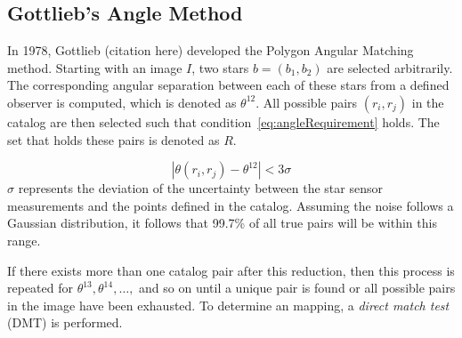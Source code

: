 
\subsection{Gottlieb's Angle Method}\label{subsec:gottlieb'sAngleMethod}
In 1978, Gottlieb (citation here) developed the Polygon Angular Matching method.
Starting with an image $I$, two stars $b = (b_1, b_2)$ are selected arbitrarily.
The corresponding angular separation between each of these stars from a defined observer is computed, which is
denoted as $\theta^{12}$.
All possible pairs $(r_i, r_j)$ in the catalog are then selected such that condition~\eqref{eq:angleRequirement} holds.
The set that holds these pairs is denoted as $R$.

\begin{equation}
    \label{eq:angleRequirement}
    | \theta(r_i, r_j) - \theta^{12} | < 3 \sigma
\end{equation}
$\sigma$ represents the deviation of the uncertainty between the star sensor measurements and the points defined in the
catalog.
Assuming the noise follows a Gaussian distribution, it follows that 99.7\% of all true pairs will be within this range.

If there exists more than one catalog pair after this reduction, then this process is repeated for
$\theta^{13}, \theta^{14}, \dots,$ and so on until a unique pair is found or all possible pairs in the image
have been exhausted.
To determine an mapping, a \textit{direct match test} (DMT) is performed.


